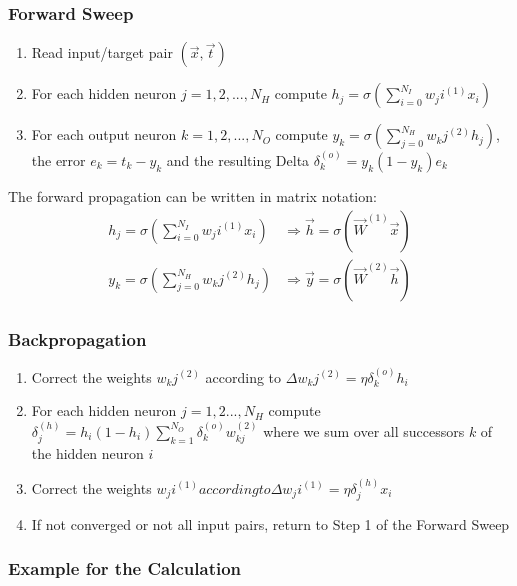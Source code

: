 \documentclass[11pt]{article}
\begin{document}
\subsubsection{Forward Sweep}

\begin{enumerate}
    \item Read input/target pair $(\vec{x},\vec{t})$
    \item For each hidden neuron $j = 1,2,...,N_H$ compute $h_j=\sigma\left(\sum_{i=0}^{N_I} w_ji^{(1)} x_i \right)$
    \item For each output neuron $k = 1,2,...,N_O$ compute $y_k=\sigma\left(\sum_{j=0}^{N_H} w_kj^{(2)} h_j \right)$, the error $e_k = t_k - y_k$ and the resulting Delta $\delta_k^{(o)} = y_k(1-y_k)e_k$
\end{enumerate}

\noindent
The forward propagation can be written in matrix notation:
\begin{align*}
    h_j=\sigma\left(\sum_{i=0}^{N_I} w_ji^{(1)} x_i \right) &\Rightarrow \vec{h} = \sigma\left( \vec{W}^{(1)} \vec{x} \right)\\
    y_k=\sigma\left(\sum_{j=0}^{N_H} w_kj^{(2)} h_j \right) &\Rightarrow \vec{y} = \sigma\left( \vec{W}^{(2)} \vec{h} \right)
\end{align*}

\subsubsection{Backpropagation}

\begin{enumerate}
    \item Correct the weights $w_kj^{(2)}$ according to $\Delta w_kj^{(2)} = \eta \delta_k^{(o)} h_i$
    \item For each hidden neuron $j = 1,2...,N_H$ compute $\delta_j^{(h)} = h_i(1-h_i)\sum_{k=1}^{N_O} \delta_k^{(o)} w_{kj}^{(2)}$ where we sum over all successors $k$ of the hidden neuron $i$
    \item Correct the weights $w_ji^{(1)} according to $$\Delta w_ji^{(1)} = \eta \delta_j^{(h)} x_i$
    \item If not converged or not all input pairs, return to Step 1 of the Forward Sweep
\end{enumerate}

\subsubsection{Example for the Calculation}
\end{document}
